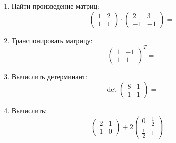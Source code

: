 {\begin{enumerate}
        \item Найти произведение матриц:
        \[%
            \begin{pmatrix}
                1 & 2 \\
                1 & 1
            \end{pmatrix}
            \cdot
            \begin{pmatrix}
                2 & 3 \\
                -1 & -1
            \end{pmatrix}
            =
        \]


        \item Транспонировать матрицу:
        \[%
            \begin{pmatrix}
                1 & -1 \\
                1 & 1
            \end{pmatrix}
            ^T = 
        \]


        \item Вычислить детерминант:
        \[%
            \det
            \begin{pmatrix}
                8 & 1 \\
                1 & 1
            \end{pmatrix}
             = 
        \]


        \item Вычислить:
        \[%
            \begin{pmatrix}
                2 & 1 \\
                1 & 0
            \end{pmatrix}
             +2
            \begin{pmatrix}
                0 & \frac{1}{2} \\
                \frac{1}{2} & 1
            \end{pmatrix}
            =
        \]
    \end{enumerate}
}


